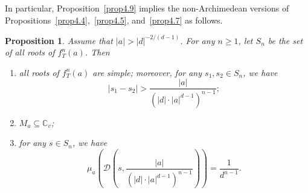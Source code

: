 \documentclass[11pt]{amsart}
\numberwithin{equation}{section}
\theoremstyle{plain}
\newtheorem{prop}[thm]{Proposition}
\theoremstyle{definition}
\theoremstyle{remark}
\newcommand{\C}{\mathbb C}
\begin{document}
In particular, Proposition~\ref{prop4.9} implies the non-Archimedean
versions of Propositions~\ref{prop4.4},~\ref{prop4.5}, and~\ref{prop4.7}
as follows.

\begin{prop}\label{prop4.10}
  Assume that $|a|>|d|^{-2/(d-1)}$. For any $n\geq1$,
let $S_{n}$ be the set of all roots of $f_{T}^{n}(a)$. Then  
\begin{enumerate}
\item\label{p4.10-1} all roots of $f_{T}^{n}(a)$ are simple; moreover, for any $s_{1},s_{2}\in S_{n}$,
we have
\[
|s_{1}-s_{2}|>\frac{|a|}{\left(|d|\cdot|a|^{d-1}\right)^{n-1}};
\]
\item\label{p4.10-2}  $M_{a}\subseteq\C_{v}$;
\item\label{p4.10-3} for any $s\in S_{n}$, we have
\[
\mu_{a}\left(\mathcal{D}\left(s,\frac{|a|}{\left(|d|\cdot|a|^{d-1}\right)^{n-1}}\right)\right)=\frac{1}{d^{n-1}}.
\]
\end{enumerate}
\end{prop}
\end{document}
